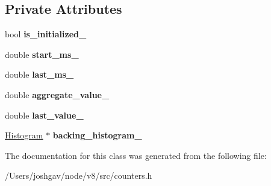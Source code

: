 \subsection*{Private Attributes}
\begin{DoxyCompactItemize}
\item 
bool {\bfseries is\+\_\+initialized\+\_\+}\hypertarget{classv8_1_1internal_1_1_aggregated_memory_histogram_aed9608ee7e2534b8b3afe0885fe2ebd6}{}\label{classv8_1_1internal_1_1_aggregated_memory_histogram_aed9608ee7e2534b8b3afe0885fe2ebd6}

\item 
double {\bfseries start\+\_\+ms\+\_\+}\hypertarget{classv8_1_1internal_1_1_aggregated_memory_histogram_aabe767eedfb4212b74fa43a8c0b3fa4a}{}\label{classv8_1_1internal_1_1_aggregated_memory_histogram_aabe767eedfb4212b74fa43a8c0b3fa4a}

\item 
double {\bfseries last\+\_\+ms\+\_\+}\hypertarget{classv8_1_1internal_1_1_aggregated_memory_histogram_ad7dc697da1c27dcd8ec687c639014cca}{}\label{classv8_1_1internal_1_1_aggregated_memory_histogram_ad7dc697da1c27dcd8ec687c639014cca}

\item 
double {\bfseries aggregate\+\_\+value\+\_\+}\hypertarget{classv8_1_1internal_1_1_aggregated_memory_histogram_a7dac53fb4d4c6e894f7855f13ffc41ec}{}\label{classv8_1_1internal_1_1_aggregated_memory_histogram_a7dac53fb4d4c6e894f7855f13ffc41ec}

\item 
double {\bfseries last\+\_\+value\+\_\+}\hypertarget{classv8_1_1internal_1_1_aggregated_memory_histogram_a9894e3e20023b4b3f778e183951b2a29}{}\label{classv8_1_1internal_1_1_aggregated_memory_histogram_a9894e3e20023b4b3f778e183951b2a29}

\item 
\hyperlink{classv8_1_1internal_1_1_histogram}{Histogram} $\ast$ {\bfseries backing\+\_\+histogram\+\_\+}\hypertarget{classv8_1_1internal_1_1_aggregated_memory_histogram_a3a2874493130c162590db0f8f9c3032f}{}\label{classv8_1_1internal_1_1_aggregated_memory_histogram_a3a2874493130c162590db0f8f9c3032f}

\end{DoxyCompactItemize}


The documentation for this class was generated from the following file\+:\begin{DoxyCompactItemize}
\item 
/\+Users/joshgav/node/v8/src/counters.\+h\end{DoxyCompactItemize}

